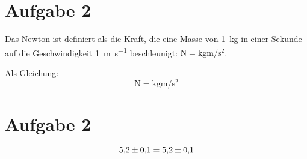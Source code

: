 \documentclass[titlepage=firstiscover]{scrartcl}
\begin{document}
\section{Aufgabe 2}
Das Newton ist definiert als die Kraft, die eine Masse von \SI{1}{\kilo\gram} in einer Sekunde auf die Geschwindigkeit \SI{1}{\meter\per\second} beschleunigt:
$\si{\newton}=\si{\kilo\gram\meter\per\second\squared}$.

Als Gleichung:
\begin{equation}
  \si{\newton} = \si{\kilo\gram\meter\per\second\squared}
\end{equation}

\section{Aufgabe 2}

\begin{equation}
  \num{5.2(1)} = \num{5.2\pm0.1}
\end{equation}
\end{document}
